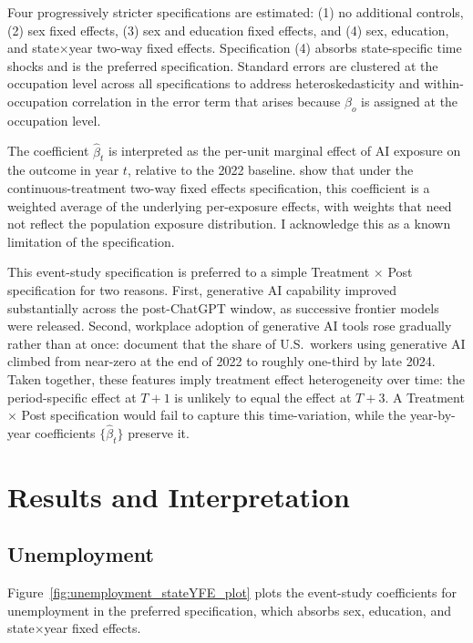 \documentclass[11pt]{article}
\begin{document}
Four progressively stricter specifications are estimated: (1) no additional controls, (2) sex fixed effects, (3) sex and education fixed effects, and (4) sex, education, and state$\times$year two-way fixed effects.  Specification (4) absorbs state-specific time shocks and is the preferred specification.  Standard errors are clustered at the occupation level across all specifications to address heteroskedasticity and within-occupation correlation in the error term that arises because $\beta_o$ is assigned at the occupation level.

The coefficient $\hat\beta_t$ is interpreted as the per-unit marginal effect of AI exposure on the outcome in year $t$, relative to the 2022 baseline.  \textcite{callaway2024continuous} show that under the continuous-treatment two-way fixed effects specification, this coefficient is a weighted average of the underlying per-exposure effects, with weights that need not reflect the population exposure distribution.  I acknowledge this as a known limitation of the specification.

This event-study specification is preferred to a simple Treatment $\times$ Post specification for two reasons.  First, generative AI capability improved substantially across the post-ChatGPT window, as successive frontier models were released.  Second, workplace adoption of generative AI tools rose gradually rather than at once: \textcite{bick2024rapid} document that the share of U.S.\ workers using generative AI climbed from near-zero at the end of 2022 to roughly one-third by late 2024.  Taken together, these features imply treatment effect heterogeneity over time: the period-specific effect at $T+1$ is unlikely to equal the effect at $T+3$.  A Treatment $\times$ Post specification would fail to capture this time-variation, while the year-by-year coefficients $\{\hat\beta_t\}$ preserve it.

\setcounter{section}{5}

\section{Results and Interpretation}

\subsection{Unemployment}

Figure~\ref{fig:unemployment_stateYFE_plot} plots the event-study coefficients for unemployment in the preferred specification, which absorbs sex, education, and state$\times$year fixed effects.
\end{document}
